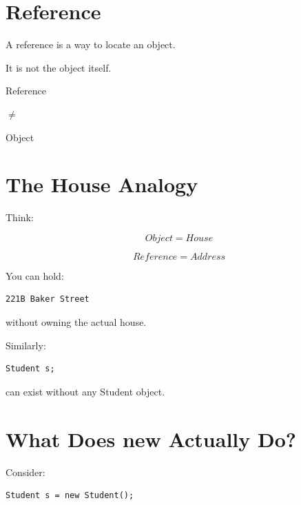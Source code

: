 \documentclass[11pt,a4paper]{book}
\begin{document}

\section{Reference}

\begin{idea}

A reference is a way to locate an object.

It is not the object itself.

\end{idea}

\begin{rosettarule}

Reference

$\neq$

Object

\end{rosettarule}


\section{The House Analogy}

Think:

\[
Object
=
House
\]

\[
Reference
=
Address
\]

You can hold:

\begin{verbatim}
221B Baker Street
\end{verbatim}

without owning the actual house.

Similarly:

\begin{verbatim}
Student s;
\end{verbatim}

can exist without any Student object.


\section{What Does new Actually Do?}

Consider:

\begin{verbatim}
Student s = new Student();
\end{verbatim}
\end{document}
